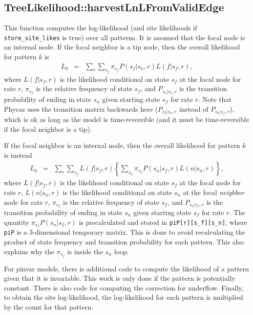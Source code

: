 \subsection{TreeLikelihood::harvestLnLFromValidEdge}

This function computes the log-likelihood (and site likelihoods if {\tt store\_site\_likes} is true) over all patterns. It is assumed that the focal node is an internal node. If the focal neighbor is a tip node, then the overall likelihood for pattern $k$ is
\begin{eqnarray*}
L_k & = & \sum_r \sum_{s_f} \pi_{s_f} P(s_f|s_n,r) L(f|s_f,r),
\end{eqnarray*}
where $L(f|s_f,r)$ is the likelihood conditional on state $s_f$ at the focal node for rate $r$, $\pi_{s_f}$ is the relative frequency of state $s_f$, and $P_{s_n|s_f,r}$ is the transition probability of ending in state $s_n$ given starting state $s_f$ for rate $r$. Note that Phycas uses the transition matrix backwards here ($P_{s_f|s_n,r}$ instead of $P_{s_n|s_f,r}$), which is ok as long as the model is time-reversible (and it must be time-reversible if the focal neighbor is a tip).

If the focal neighbor is an internal node, then the overall likelihood for pattern $k$ is instead
\begin{eqnarray*}
L_k & = & \sum_r \sum_{s_f} L(f|s_f,r) \left\{ \sum_{s_n} \pi_{s_f} P(s_n|s_f,r) L(n|s_n,r) \right\},
\end{eqnarray*}
where $L(f|s_f,r)$ is the likelihood conditional on state $s_f$ at the focal node for rate $r$, $L(n|s_n,r)$ is the likelihood conditional on state $s_n$ at the focal {\em neighbor} node for rate $r$, $\pi_{s_f}$ is the relative frequency of state $s_f$, and $P_{s_n|s_f,r}$ is the transition probability of ending in state $s_n$ given starting state $s_f$ for rate $r$. The quantity $\pi_{s_f} P(s_n|s_f,r)$ is precalculated and stored in {\tt piP[r][s\_f][s\_n]}, where {\tt piP} is a 3-dimensional temporary matrix. This is done to avoid recalculating the product of state frequency and transition probability for each pattern. This also explains why the $\pi_{s_f}$ is inside the $s_n$ loop.

For pinvar models, there is additional code to compute the likelihood of a pattern given that it is invariable. This work is only done if the pattern is potentially constant. There is also code for computing the correction for underflow. Finally, to obtain the site log-likelihood, the log-likelihood for each pattern is multiplied by the count for that pattern.


